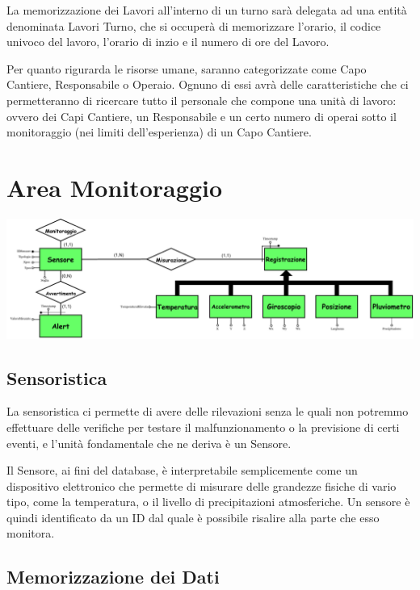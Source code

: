 \documentclass[12pt,a4paper]{report}
\begin{document}
            La memorizzazione dei Lavori all'interno di un turno sarà delegata ad una entità denominata Lavori Turno, che si occuperà di memorizzare l'orario, il codice univoco del lavoro, l'orario di inzio e il numero di ore del Lavoro.

            Per quanto rigurarda le risorse umane, saranno categorizzate come Capo Cantiere, Responsabile o Operaio. Ognuno di essi avrà delle caratteristiche che ci permetteranno di ricercare tutto il personale che compone una unità di lavoro: ovvero dei Capi Cantiere, un Responsabile e un certo numero di operai sotto il monitoraggio (nei limiti dell'esperienza) di un Capo Cantiere. 
    
\chapter{Area Monitoraggio}
        \begin{center}
            \includegraphics[scale=0.65]{ER_monitoraggio.pdf}
        \end{center}
        \section{Sensoristica}
            La sensoristica ci permette di avere delle rilevazioni senza le quali non potremmo effettuare delle verifiche per testare il malfunzionamento o la previsione di certi eventi, e l'unità fondamentale che ne deriva è un Sensore.

            Il Sensore, ai fini del database, è interpretabile semplicemente come un dispositivo elettronico che permette di misurare delle grandezze fisiche di vario tipo, come la temperatura, o il livello di precipitazioni atmosferiche. Un sensore è quindi identificato da un ID dal quale è possibile risalire alla parte che esso monitora.

        \section{Memorizzazione dei Dati}
        
\end{document}
